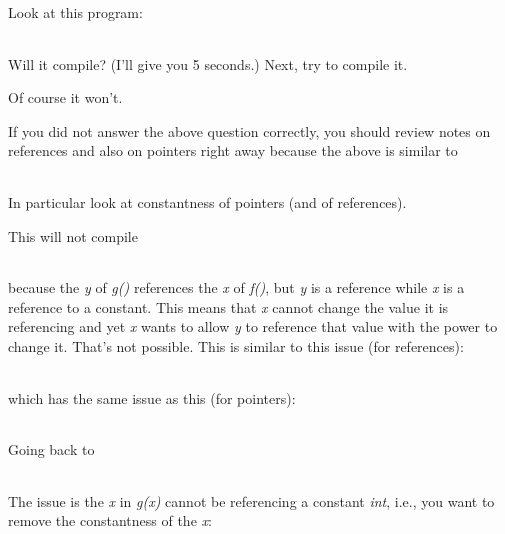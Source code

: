 \documentclass[
]{article}
\begin{document}
Look at this program:

\begin{longtable}[]{@{}@{}}
\toprule
\endhead
\bottomrule
\end{longtable}

Will it compile? (I'll give you 5 seconds.) Next, try to compile it.

Of course it won't.

If you did not answer the above question correctly, you should review
notes on references and also on pointers right away because the above is
similar to

\begin{longtable}[]{@{}@{}}
\toprule
\endhead
\bottomrule
\end{longtable}

In particular look at constantness of pointers (and of references).

This will not compile

\begin{longtable}[]{@{}@{}}
\toprule
\endhead
\bottomrule
\end{longtable}

because the \emph{y} of \emph{g()} references the \emph{x} of
\emph{f()}, but\emph{ y} is a reference while \emph{x} is a reference to
a constant. This means that \emph{x} cannot change the value it is
referencing and yet \emph{x} wants to allow \emph{y} to reference that
value with the power to change it. That's not possible. This is similar
to this issue (for references):

\begin{longtable}[]{@{}@{}}
\toprule
\endhead
\bottomrule
\end{longtable}

which has the same issue as this (for pointers):

\begin{longtable}[]{@{}@{}}
\toprule
\endhead
\bottomrule
\end{longtable}

Going back to

\begin{longtable}[]{@{}@{}}
\toprule
\endhead
\bottomrule
\end{longtable}

The issue is the \emph{x} in \emph{g(x)} cannot be referencing a
constant \emph{int}, i.e., you want to remove the constantness of the
\emph{x}:

\begin{longtable}[]{@{}@{}}
\toprule
\endhead
\bottomrule
\end{longtable}
\end{document}
